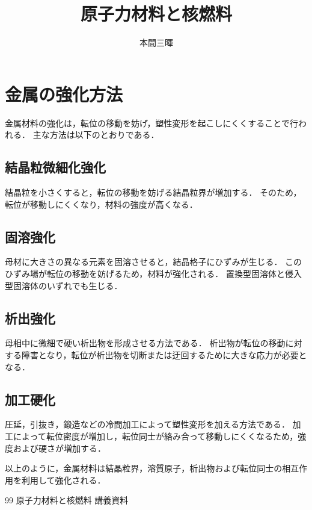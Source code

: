 \documentclass[titlepage,a4paper]{jsarticle}
\title{原子力材料と核燃料}
\author{本間三暉}
\begin{document}
\maketitle
\section{金属の強化方法}
金属材料の強化は，転位の移動を妨げ，塑性変形を起こしにくくすることで行われる．
主な方法は以下のとおりである．

\subsection{結晶粒微細化強化}
結晶粒を小さくすると，転位の移動を妨げる結晶粒界が増加する．
そのため，転位が移動しにくくなり，材料の強度が高くなる．

\subsection{固溶強化}
母材に大きさの異なる元素を固溶させると，結晶格子にひずみが生じる．
このひずみ場が転位の移動を妨げるため，材料が強化される．
置換型固溶体と侵入型固溶体のいずれでも生じる．

\subsection{析出強化}
母相中に微細で硬い析出物を形成させる方法である．
析出物が転位の移動に対する障害となり，転位が析出物を切断または迂回するために大きな応力が必要となる．

\subsection{加工硬化}
圧延，引抜き，鍛造などの冷間加工によって塑性変形を加える方法である．
加工によって転位密度が増加し，転位同士が絡み合って移動しにくくなるため，強度および硬さが増加する．

以上のように，金属材料は結晶粒界，溶質原子，析出物および転位同士の相互作用を利用して強化される．

\begin{thebibliography}{99}
\bibitem{} 原子力材料と核燃料 講義資料
\end{thebibliography}
\end{document}
